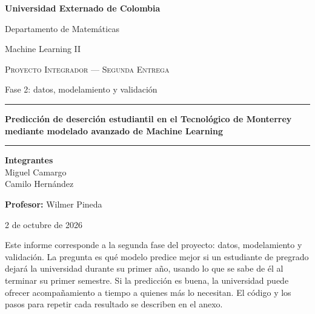 \documentclass[11pt,a4paper]{article}
\newcommand{\tituloProyecto}{Predicción de deserción estudiantil en el Tecnológico de Monterrey mediante modelado avanzado de Machine Learning}
\newcommand{\nombreCurso}{Machine Learning II}
\newcommand{\nombreProfesor}{Wilmer Pineda}
\begin{document}
\begin{titlepage}
\centering
\vspace*{1.5cm}
{\Large\bfseries Universidad Externado de Colombia\par}
\vspace{0.2cm}
{\large Departamento de Matemáticas\par}
\vspace{0.15cm}
{\large \nombreCurso\par}
\vspace{2.2cm}

{\large\scshape Proyecto Integrador --- Segunda Entrega\par}
\vspace{0.2cm}
{\normalsize Fase 2: datos, modelamiento y validación\par}
\vspace{0.4cm}
\rule{0.6\linewidth}{0.4pt}
\vspace{0.6cm}

{\Huge\bfseries \tituloProyecto \par}
\vspace{0.6cm}
\rule{0.6\linewidth}{0.4pt}

\vfill

\begin{minipage}{0.75\linewidth}
\centering
\textbf{Integrantes}\\[0.3cm]
Miguel Camargo \\
Camilo Hernández
\end{minipage}

\vspace{1.2cm}
\textbf{Profesor:} \nombreProfesor

\vspace{1.2cm}
{\large 2 de octubre de 2026 \par}
\vfill
\end{titlepage}

\setcounter{page}{1}

Este informe corresponde a la segunda fase del proyecto: datos, modelamiento y validación. La pregunta es qué modelo predice mejor si un estudiante de pregrado dejará la universidad durante su primer año, usando lo que se sabe de él al terminar su primer semestre. Si la predicción es buena, la universidad puede ofrecer acompañamiento a tiempo a quienes más lo necesitan. El código y los pasos para repetir cada resultado se describen en el anexo.
\end{document}
